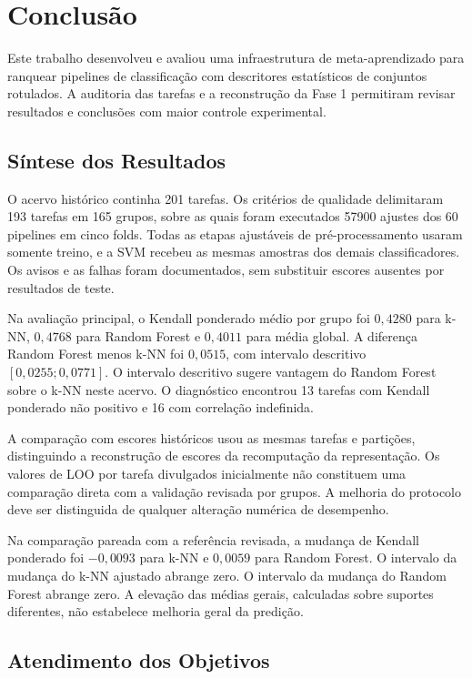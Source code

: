 \chapter{Conclusão}\label{cap:conclusoeseperspectivas}

Este trabalho desenvolveu e avaliou uma infraestrutura de meta-aprendizado para ranquear pipelines de classificação com descritores estatísticos de conjuntos rotulados. A auditoria das tarefas e a reconstrução da Fase 1 permitiram revisar resultados e conclusões com maior controle experimental.

\section{Síntese dos Resultados}\label{sec:sintese-conclusao}

O acervo histórico continha 201 tarefas. Os critérios de qualidade delimitaram 193 tarefas em 165 grupos, sobre as quais foram executados 57900 ajustes dos 60 pipelines em cinco folds. Todas as etapas ajustáveis de pré-processamento usaram somente treino, e a SVM recebeu as mesmas amostras dos demais classificadores. Os avisos e as falhas foram documentados, sem substituir escores ausentes por resultados de teste.

Na avaliação principal, o Kendall ponderado médio por grupo foi $0{,}4280$ para k-NN, $0{,}4768$ para Random Forest e $0{,}4011$ para média global. A diferença Random Forest menos k-NN foi $0{,}0515$, com intervalo descritivo $[0{,}0255;0{,}0771]$. O intervalo descritivo sugere vantagem do Random Forest sobre o k-NN neste acervo. O diagnóstico encontrou 13 tarefas com Kendall ponderado não positivo e 16 com correlação indefinida.

A comparação com escores históricos usou as mesmas tarefas e partições, distinguindo a reconstrução de escores da recomputação da representação. Os valores de LOO por tarefa divulgados inicialmente não constituem uma comparação direta com a validação revisada por grupos. A melhoria do protocolo deve ser distinguida de qualquer alteração numérica de desempenho.

Na comparação pareada com a referência revisada, a mudança de Kendall ponderado foi $-0{,}0093$ para k-NN e $0{,}0059$ para Random Forest. O intervalo da mudança do k-NN ajustado abrange zero. O intervalo da mudança do Random Forest abrange zero. A elevação das médias gerais, calculadas sobre suportes diferentes, não estabelece melhoria geral da predição.

\section{Atendimento dos Objetivos}\label{sec:objetivosAtendidos}

